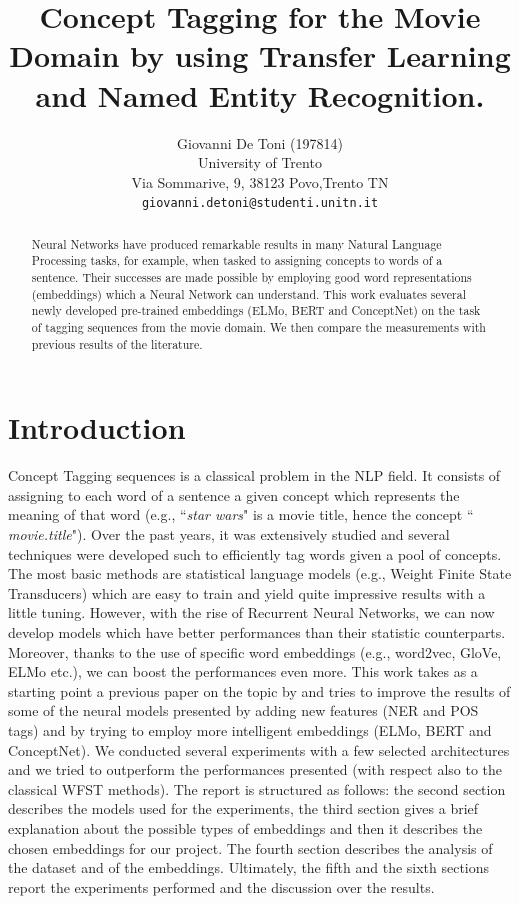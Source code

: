 \documentclass[11pt,a4paper]{article}
\title{Concept Tagging for the Movie Domain by using Transfer Learning and Named Entity Recognition.}
\author{Giovanni De Toni (197814) \\
  University of Trento \\ Via Sommarive, 9, 38123 Povo,Trento TN\\
  \texttt{giovanni.detoni@studenti.unitn.it}}
\date{}
\begin{document}
\maketitle

\begin{abstract}
Neural Networks have produced remarkable results in many Natural Language Processing tasks, for example, when tasked to assigning concepts to words of a sentence. Their successes are made possible by employing good word representations (embeddings) which a Neural Network can understand. This work evaluates several newly developed pre-trained embeddings (ELMo, BERT and ConceptNet) on the task of tagging sequences from the movie domain. We then compare the measurements with previous results of the literature.
\end{abstract}

\section{Introduction}
Concept Tagging sequences is a classical problem in 
the NLP field. It consists of assigning to each word 
of a sentence a given concept which represents the 
meaning of that word (e.g., ``\textit{star wars}" is 
a movie title, hence the concept ``
\textit{movie.title}"). Over the past years, it was 
extensively studied and several techniques were 
developed such to efficiently tag words given a pool 
of concepts. The most basic methods are statistical 
language models (e.g., Weight Finite State Transducers) 
which are easy to train and yield quite impressive 
results with a little tuning. However, with the rise 
of Recurrent Neural Networks, we can now develop 
models which have better performances than their 
statistic counterparts. Moreover, thanks to the use 
of specific word embeddings (e.g., word2vec, GloVe, 
ELMo etc.), we can boost the performances even more.
This work takes as a starting point a previous paper 
on the topic by \citet{gobbi} and tries to improve 
the results of some of the neural models presented 
by adding new features (NER and POS tags) and 
by trying to employ more intelligent embeddings 
(ELMo, BERT and ConceptNet). We conducted several experiments with a few selected architectures and we tried to outperform the performances presented (with respect also to the classical WFST methods). The report is structured as follows: the second section describes 
the models used for the experiments, the third section gives a brief explanation about the possible types of embeddings and then it describes the chosen embeddings for our project. The fourth section describes the analysis of the 
dataset and of the embeddings. Ultimately, the fifth
and the sixth sections report the experiments 
performed and the discussion over the results.
\end{document}
